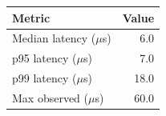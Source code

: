 \begin{tabular}{lr}
\toprule
Metric & Value \\
\midrule
Median latency ($\mu$s) & 6.0 \\
p95 latency ($\mu$s) & 7.0 \\
p99 latency ($\mu$s) & 18.0 \\
Max observed ($\mu$s) & 60.0 \\
\bottomrule
\end{tabular}
